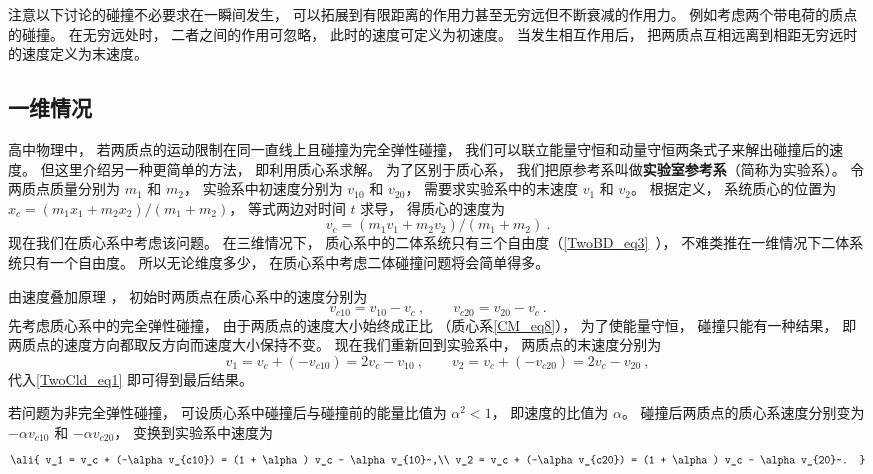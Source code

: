 

注意以下讨论的碰撞不必要求在一瞬间发生， 可以拓展到有限距离的作用力甚至无穷远但不断衰减的作用力。 例如考虑两个带电荷的质点的碰撞。 在无穷远处时， 二者之间的作用可忽略， 此时的速度可定义为初速度。 当发生相互作用后， 把两质点互相远离到相距无穷远时的速度定义为末速度。

\subsection{一维情况}
高中物理中， 若两质点的运动限制在同一直线上且碰撞为完全弹性碰撞， 我们可以联立能量守恒和动量守恒两条式子来解出碰撞后的速度。 
但这里介绍另一种更简单的方法， 即利用质心系求解。 为了区别于质心系， 我们把原参考系叫做\textbf{实验室参考系}（简称为实验系）。 令两质点质量分别为 $m_1$ 和 $m_2$， 实验系中初速度分别为 $v_{10}$ 和 $v_{20}$， 需要求实验系中的末速度 $v_1$ 和 $v_2$。 根据定义， 系统质心的位置为 $x_c = (m_1 x_1 + m_2 x_2)/(m_1 + m_2)$， 等式两边对时间 $t$ 求导， 得质心的速度为
\begin{equation}\label{TwoCld_eq1}
v_c = (m_1 v_1 + m_2 v_2)/(m_1 + m_2)~.
\end{equation}
现在我们在质心系中考虑该问题。 在三维情况下， 质心系中的二体系统只有三个自由度（\autoref{TwoBD_eq3}~）， 不难类推在一维情况下二体系统只有一个自由度。 所以无论维度多少， 在质心系中考虑二体碰撞问题将会简单得多。 

由速度叠加原理%
， 初始时两质点在质心系中的速度分别为
\begin{equation}
v_{c10} = v_{10} - v_c~, \qquad v_{c20} = v_{20} - v_c~.
\end{equation}
先考虑质心系中的完全弹性碰撞， 由于两质点的速度大小始终成正比 （质心系\autoref{CM_eq8}）， 为了使能量守恒， 碰撞只能有一种结果， 即两质点的速度方向都取反方向而速度大小保持不变。 现在我们重新回到实验系中， 两质点的末速度分别为
\begin{equation}
v_1 = v_c + (-v_{c10}) = 2v_c - v_{10}  ~,\qquad v_2 = v_c + (-v_{c20}) = 2v_c - v_{20}~,
\end{equation}
代入\autoref{TwoCld_eq1} 即可得到最后结果。

若问题为非完全弹性碰撞， 可设质心系中碰撞后与碰撞前的能量比值为 $\alpha^2 < 1$， 即速度的比值为 $\alpha$。 碰撞后两质点的质心系速度分别变为 $-\alpha v_{c10}$ 和 $-\alpha v_{c20}$， 变换到实验系中速度为
\begin{equation}\ali{
v_1 = v_c + (-\alpha v_{c10}) = (1 + \alpha) v_c - \alpha v_{10}~,\\
v_2 = v_c + (-\alpha v_{c20}) = (1 + \alpha) v_c - \alpha v_{20}~.
}\end{equation}

